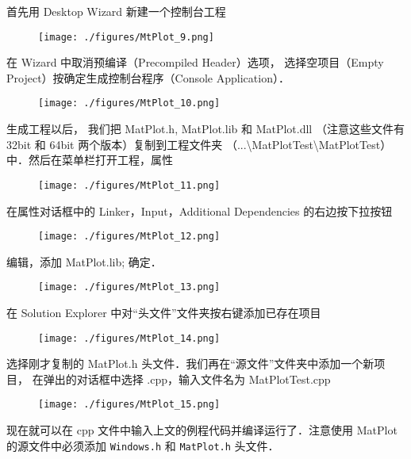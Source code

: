 首先用 Desktop Wizard 新建一个控制台工程
\begin{figure}[ht]
\centering
\texttt{[image: ./figures/MtPlot\_9.png]}
\caption{} \label{MtPlot_fig9}
\end{figure}

在 Wizard 中取消预编译（Precompiled Header）选项， 选择空项目（Empty Project）按确定生成控制台程序（Console Application）．

\begin{figure}[ht]
\centering
\texttt{[image: ./figures/MtPlot\_10.png]}
\caption{} \label{MtPlot_fig10}
\end{figure}

生成工程以后， 我们把 MatPlot.h, MatPlot.lib 和 MatPlot.dll （注意这些文件有 32bit 和 64bit 两个版本）复制到工程文件夹 （...\textbackslash MatPlotTest\textbackslash MatPlotTest）中．然后在菜单栏打开工程，属性

\begin{figure}[ht]
\centering
\texttt{[image: ./figures/MtPlot\_11.png]}
\caption{} \label{MtPlot_fig11}
\end{figure}

在属性对话框中的 Linker，Input，Additional Dependencies 的右边按下拉按钮

\begin{figure}[ht]
\centering
\texttt{[image: ./figures/MtPlot\_12.png]}
\caption{} \label{MtPlot_fig12}
\end{figure}

编辑，添加 MatPlot.lib; 确定．

\begin{figure}[ht]
\centering
\texttt{[image: ./figures/MtPlot\_13.png]}
\caption{} \label{MtPlot_fig13}
\end{figure}

在 Solution Explorer 中对“头文件”文件夹按右键添加已存在项目

\begin{figure}[ht]
\centering
\texttt{[image: ./figures/MtPlot\_14.png]}
\caption{} \label{MtPlot_fig14}
\end{figure}

选择刚才复制的 MatPlot.h 头文件．我们再在“源文件”文件夹中添加一个新项目， 在弹出的对话框中选择 .cpp，输入文件名为 MatPlotTest.cpp

\begin{figure}[ht]
\centering
\texttt{[image: ./figures/MtPlot\_15.png]}
\caption{} \label{MtPlot_fig15}
\end{figure}

现在就可以在 cpp 文件中输入上文的例程代码并编译运行了．注意使用 MatPlot 的源文件中必须添加 \verb|Windows.h| 和 \verb|MatPlot.h| 头文件．
